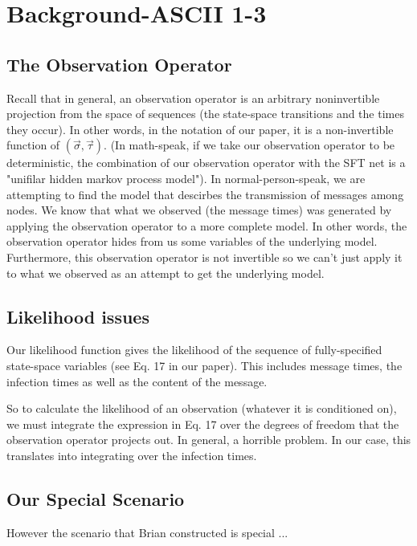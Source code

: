 \documentclass{article}
\begin{document}
\section{Background-ASCII 1-3}

\subsection{The Observation Operator}

	Recall that in general, an observation operator is an arbitrary
	noninvertible projection from the space of sequences (the state-space
	transitions and the times they occur). In other words, in the notation
	of our paper, it is a non-invertible function of $(\vec{\sigma},
	\vec{\tau})$. (In math-speak, if we take our observation operator to be
	deterministic, the combination of our observation operator with the
	SFT net is a "unifilar hidden markov process model").  In
	normal-person-speak, we are attempting to find the model that descirbes
	the transmission of messages among nodes.  We know that what we
	observed (the message times) was generated  by applying the observation
	operator to a more complete model.  In other words, the observation 
        operator hides from us some variables of the underlying model.  
        Furthermore, this observation operator is not invertible so we can't 
        just apply it to what we observed as an attempt to get the underlying 
        model.

\subsection{Likelihood issues}
        Our likelihood function gives the 
        likelihood of the sequence of fully-specified state-space variables 
        (see Eq. 17 in our paper). This includes message times, the infection times 
        as well as the content of the message.  

	So to calculate the likelihood of an observation (whatever it is
	conditioned on), we must integrate the expression in Eq. 17 over the
	degrees of freedom that the observation operator projects out. In
	general, a horrible problem. In our case, this translates
	into integrating over the infection times. 

\subsection{Our Special Scenario}	
        However the scenario that Brian constructed is special ...
\end{document}
